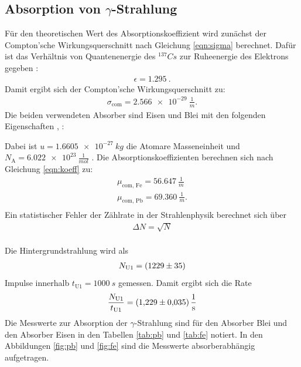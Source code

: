 \subsection{Absorption von $\gamma$-Strahlung}
Für den theoretischen Wert des Absorptionskoeffizient wird zunächst der Compton'sche Wirkungsquerschnitt nach Gleichung \eqref{eqn:sigma} berechnet.
Dafür ist das Verhältnis von Quantenenergie des $^{137}Cs$ zur Ruheenergie des Elektrons gegeben \cite{1}:
\begin{align*}
  \epsilon=\SI{1.295}{}.
\end{align*}
Damit ergibt sich der Compton'sche Wirkungsquerschnitt zu:
\begin{align*}
  \sigma_{\text{com}}= \SI{2.566e-29}{\frac{1}{m}}.
\end{align*}
Die beiden verwendeten Absorber sind Eisen und Blei mit den folgenden Eigenschaften \cite{fe}, \cite{pb}:

Dabei ist $u=\SI{1.6605e-27}{kg}$ die Atomare Masseneinheit und $N_{\text{A}}=\SI{6.022e23}{\frac{1}{mol}}$ \cite{taschenrechner}.
Die Absorptionskoeffizienten berechnen sich nach Gleichung \eqref{eqn:koeff} zu:
\begin{align*}
  \mu_{\text{com, Fe}}= \SI{56.647}{\frac{1}{m}}\\
  \mu_{\text{com, Pb}}= \SI{69.360}{\frac{1}{m}}.\\
\end{align*}
Ein statistischer Fehler der Zählrate in der Strahlenphysik berechnet sich über
\begin{align*}
  \Delta N = \sqrt{N}
\end{align*}
\\Die Hintergrundstrahlung wird als
\begin{align*}
   N_{\text{U1}}=\SI{1229\pm35}{}
\end{align*}
Impulse innerhalb $t_{\text{U1}}=\SI{1000}{s}$ gemessen. Damit ergibt sich die Rate
\begin{align*}
  \frac{N_{\text{U1}}}{t_{\text{U1}}}=\SI{1.229 \pm 0.035}{\frac{1}{s}}
\end{align*}
Die Messwerte zur Absorption der $\gamma$-Strahlung sind für den Absorber Blei und den Absorber Eisen in den Tabellen \ref{tab:pb} und \ref{tab:fe} notiert.
In den Abbildungen \ref{fig:pb} und \ref{fig:fe} sind die Messwerte absorberabhängig aufgetragen.
